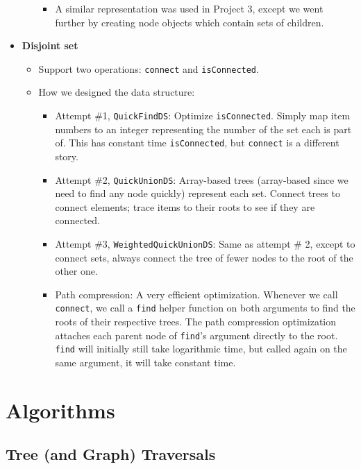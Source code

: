 \documentclass{article}
\begin{document}
\begin{itemize}
\begin{itemize}
        \begin{itemize}
            \item A similar representation was used in Project 3, except we went further by creating node objects which contain sets of children.
        \end{itemize}
    \end{itemize}
    \item \textbf{Disjoint set}
    \begin{itemize}
        \item Support two operations: \texttt{connect} and \texttt{isConnected}.
        \item How we designed the data structure:
        \begin{itemize}
            \item Attempt \#1, \texttt{QuickFindDS}: Optimize \texttt{isConnected}. Simply map item numbers to an integer representing the number of the set each is part of. This has constant time \texttt{isConnected}, but \texttt{connect} is a different story.
            \item Attempt \#2, \texttt{QuickUnionDS}: Array-based trees (array-based since we need to find any node quickly) represent each set. Connect trees to connect elements; trace items to their roots to see if they are connected.
            \item Attempt \#3, \texttt{WeightedQuickUnionDS}: Same as attempt \# 2, except to connect sets, always connect the tree of fewer nodes to the root of the other one.
            \item Path compression: A very efficient optimization. Whenever we call \texttt{connect}, we call a \texttt{find} helper function on both arguments to find the roots of their respective trees. The path compression optimization attaches each parent node of \texttt{find}'s argument directly to the root. \texttt{find} will initially still take logarithmic time, but called again on the same argument, it will take constant time.
        \end{itemize}
    \end{itemize}
\end{itemize}

\section{Algorithms}

\subsection*{Tree (and Graph) Traversals}
\end{document}
